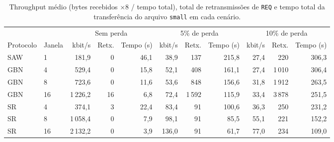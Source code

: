 \begin{table}[H]
\centering
\footnotesize
\setlength{\tabcolsep}{4pt}
\begin{tabular}{llrrrrrrrrr}
\toprule
 & & \multicolumn{3}{c}{Sem perda} & \multicolumn{3}{c}{5\% de perda} & \multicolumn{3}{c}{10\% de perda} \\
\cmidrule(lr){3-5}\cmidrule(lr){6-8}\cmidrule(lr){9-11}
Protocolo & Janela & kbit/s & Retx. & Tempo (s) & kbit/s & Retx. & Tempo (s) & kbit/s & Retx. & Tempo (s) \\
\midrule
SAW & 1 & 181,9 & 0 & 46,1 & 38,9 & 137 & 215,8 & 27,4 & 220 & 306,3 \\
\midrule
GBN & 4 & 529,4 & 0 & 15,8 & 52,1 & 408 & 161,1 & 27,4 & 1\,010 & 306,4 \\
GBN & 8 & 723,6 & 0 & 11,6 & 53,6 & 848 & 156,6 & 31,8 & 1\,912 & 263,5 \\
GBN & 16 & 1\,226,2 & 16 & 6,8 & 72,4 & 1\,592 & 115,9 & 33,4 & 3\,878 & 251,5 \\
\midrule
SR & 4 & 374,1 & 3 & 22,4 & 83,4 & 91 & 100,6 & 36,3 & 250 & 231,2 \\
SR & 8 & 1\,058,4 & 0 & 7,9 & 98,1 & 91 & 85,5 & 55,1 & 221 & 152,2 \\
SR & 16 & 2\,132,2 & 0 & 3,9 & 136,0 & 91 & 61,7 & 77,0 & 234 & 109,0 \\
\bottomrule
\end{tabular}
\caption{Throughput médio (bytes recebidos $\times 8$ / tempo total), total de retransmissões de \texttt{REQ} e tempo total da transferência do arquivo \texttt{small} em cada cenário.}
\label{tab:comparativa}
\end{table}
